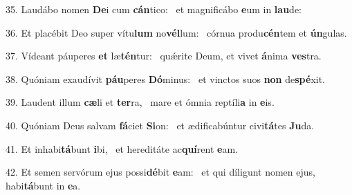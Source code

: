 35. Laudábo nomen \textbf{De}i cum \textbf{cán}tico: \ast\  et magnificábo \textbf{e}um in \textbf{lau}de:\

36. Et placébit Deo super vítu\textbf{lum} no\textbf{vél}lum: \ast\  córnua produ\textbf{cén}tem et \textbf{ún}gulas.\

37. Vídeant páuperes \textbf{et} læ\textbf{tén}tur: \ast\  quǽrite Deum, et vivet \textbf{á}nima \textbf{ves}tra.\

38. Quóniam exaudívit \textbf{páu}peres \textbf{Dó}minus: \ast\  et vinctos suos \textbf{non} de\textbf{spé}xit.\

39. Laudent illum \textbf{cæ}li et \textbf{ter}ra, \ast\  mare et ómnia reptíli\textbf{a} in \textbf{e}is.\

40. Quóniam Deus salvam \textbf{fá}ciet \textbf{Si}on: \ast\  et ædificabúntur civi\textbf{tá}tes \textbf{Ju}da.\

41. Et inhabi\textbf{tá}bunt \textbf{i}bi, \ast\  et hereditáte ac\textbf{quí}rent \textbf{e}am.\

42. Et semen servórum ejus possi\textbf{dé}bit \textbf{e}am: \ast\  et qui díligunt nomen ejus, habi\textbf{tá}bunt in \textbf{e}a.\

